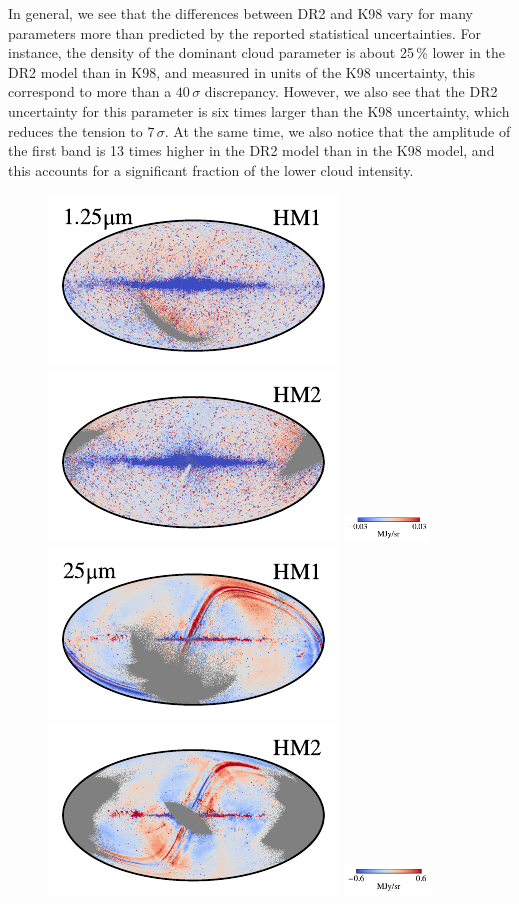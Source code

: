 \documentclass[twocolumn]{aa}
\begin{document}
In general, we see that the differences between DR2 and K98 vary for
many parameters more than predicted by the reported statistical
uncertainties. For instance, the density of the dominant cloud
parameter is about 25\,\% lower in the DR2 model than in K98, and
measured in units of the K98 uncertainty, this correspond to more than
a $40\,\sigma$ discrepancy. However, we also see that the DR2
uncertainty for this parameter is six times larger than the K98
uncertainty, which reduces the tension to $7\,\sigma$. At the same
time, we also notice that the amplitude of the first band is 13 times
higher in the DR2 model than in the K98 model, and this accounts for a
significant fraction of the lower cloud intensity.

\begin{figure}[t]
    \centering
    \includegraphics[width=0.22\linewidth]{figs/compare_res/cosmoglobe_res_01a.pdf}%
    \includegraphics[width=0.22\linewidth]{figs/compare_res/cosmoglobe_res_01b.pdf}%
    \includegraphics[width=23mm,angle=90]{figs/compare_res/cbar_01.pdf}\hspace*{3mm}
    \includegraphics[width=0.22\linewidth]{figs/compare_res/cosmoglobe_res_06a.pdf}%
    \includegraphics[width=0.22\linewidth]{figs/compare_res/cosmoglobe_res_06b.pdf}%
    \includegraphics[width=23mm,angle=90]{figs/compare_res/cbar_06.pdf}\\

\end{figure}
\end{document}
